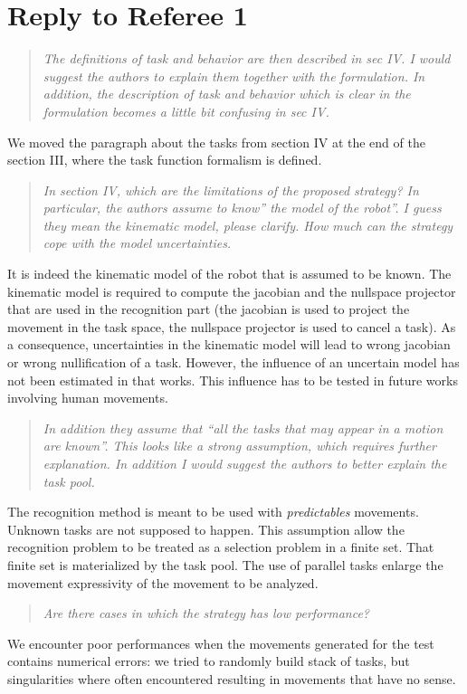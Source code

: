 \documentclass[11pt]{article}
\begin{document}
\section{Reply to Referee 1}
\begin{quote}
\textit{
  The definitions of task and behavior are then described in sec IV.  I would suggest the authors to explain them together with the formulation.  In addition, the description of task and behavior which is clear in the formulation becomes a little bit confusing in sec IV.
}
\end{quote}
  We moved the paragraph about the tasks from section IV at the end of the section III, where the 
  task function formalism is defined.
\begin{quote}
\textit{
  In section IV, which are the limitations of the proposed strategy? In particular, the authors assume to know” the model of the robot”.  I guess they mean the kinematic model, please clarify. How much can the strategy cope with the model uncertainties.
}
\end{quote}
It is indeed the kinematic model of the robot that is assumed to be known. The kinematic model is
required to compute the jacobian and the nullspace projector that are used in the recognition part
(the jacobian is used to project the movement in the task space, the nullspace projector is used
 to cancel a task).
As a consequence, uncertainties in the kinematic model will lead to wrong jacobian or wrong
nullification of a task. However, the influence
of an uncertain model has not been estimated in that works. 
This influence has to be tested in future works involving human movements.

\begin{quote}
\textit{
 In addition they assume that “all the tasks that may appear in a motion are known”.  This looks like a strong assumption, which requires further explanation.
  In addition I would suggest the authors to better explain the task pool.
}
\end{quote}
The recognition method is meant to be used with \emph{predictables} movements.
Unknown tasks are not supposed to happen. This assumption allow the 
recognition problem to be treated as a selection problem in a finite
set.
That finite set is materialized by the task pool.
The use of parallel tasks enlarge the movement expressivity of the movement to be analyzed.

\begin{quote}
\textit{
 Are there cases in which the strategy has low performance?
}
 \end{quote}
 We encounter poor performances when the
 movements generated for the test contains 
 numerical errors: we tried to randomly build stack of tasks, but
 singularities where often encountered resulting in
 movements that have no sense.
\end{document}
